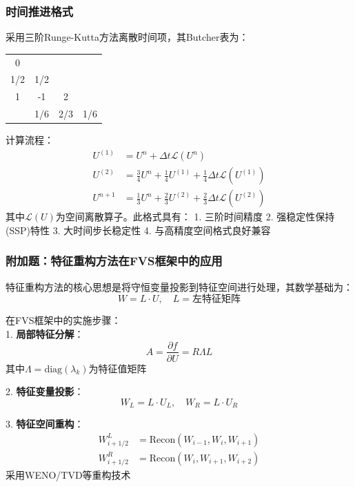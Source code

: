 \documentclass[UTF8]{ctexart}
\begin{document}
\subsubsection{时间推进格式}
采用三阶Runge-Kutta方法离散时间项，其Butcher表为：
\begin{center}
\begin{tabular}{c|ccc}
0 & & & \\
1/2 & 1/2 & & \\
1 & -1 & 2 & \\
\hline
& 1/6 & 2/3 & 1/6
\end{tabular}
\end{center}
计算流程：
\begin{align}
U^{(1)} &= U^n + \Delta t \mathcal{L}(U^n) \\
U^{(2)} &= \frac{3}{4}U^n + \frac{1}{4}U^{(1)} + \frac{1}{4}\Delta t \mathcal{L}(U^{(1)}) \\
U^{n+1} &= \frac{1}{3}U^n + \frac{2}{3}U^{(2)} + \frac{2}{3}\Delta t \mathcal{L}(U^{(2)})
\end{align}
其中$\mathcal{L}(U)$为空间离散算子。此格式具有：
1. 三阶时间精度
2. 强稳定性保持(SSP)特性
3. 大时间步长稳定性
4. 与高精度空间格式良好兼容

\subsubsection{附加题：特征重构方法在FVS框架中的应用}
\label{sec:char_recon}

特征重构方法的核心思想是将守恒变量投影到特征空间进行处理，其数学基础为：
\begin{equation}
W = L \cdot U, \quad L = \text{左特征矩阵}
\end{equation}

在FVS框架中的实施步骤：\\
1. \textbf{局部特征分解}：
   \begin{equation}
   A = \frac{\partial f}{\partial U} = R\Lambda L
   \end{equation}
   其中$\Lambda = \text{diag}(\lambda_k)$为特征值矩阵

2. \textbf{特征变量投影}：
   \begin{equation}
   W_L = L \cdot U_L, \quad W_R = L \cdot U_R
   \end{equation}

3. \textbf{特征空间重构}：
   \begin{align}
   W_{i+1/2}^L &= \text{Recon}(W_{i-1}, W_i, W_{i+1}) \\
   W_{i+1/2}^R &= \text{Recon}(W_i, W_{i+1}, W_{i+2})
   \end{align}
   采用WENO/TVD等重构技术
\end{document}

